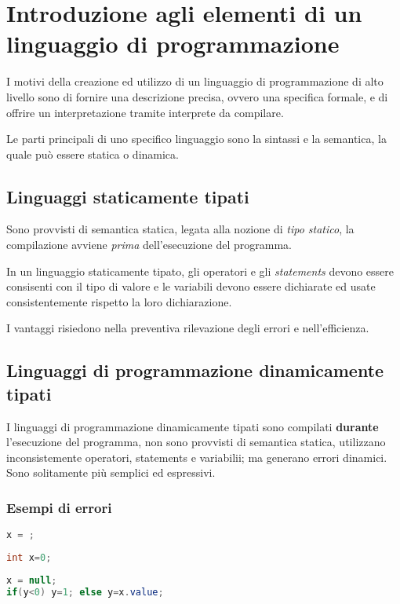 \chapter{Introduzione agli elementi di un linguaggio di programmazione}\label{ch:elementi}
I motivi della creazione ed utilizzo di un linguaggio di programmazione di alto
livello sono di fornire una descrizione precisa, ovvero una specifica formale,
e di offrire un interpretazione tramite interprete da compilare.

Le parti principali di uno specifico linguaggio sono la sintassi e la semantica,
la quale può essere statica o dinamica.

\section{Linguaggi staticamente tipati}
Sono provvisti di semantica statica, legata alla nozione di \emph{tipo statico},
la compilazione avviene   \emph{prima} dell'esecuzione del programma.

In un linguaggio staticamente tipato, gli operatori e gli \textit{statements}
devono essere consisenti con il tipo di valore e le variabili devono essere
dichiarate ed usate consistentemente rispetto la loro dichiarazione.

I vantaggi risiedono nella preventiva rilevazione degli errori e nell'efficienza.

\section{Linguaggi di programmazione dinamicamente tipati}
I linguaggi di programmazione dinamicamente tipati sono compilati \textbf{durante}
l'esecuzione del programma, non sono provvisti di semantica statica, utilizzano
inconsistemente operatori, statements e variabilii; ma generano errori dinamici.
Sono solitamente più semplici ed espressivi.

\subsection{Esempi di errori}
\begin{lstlisting}[language=Java, caption={Errore di sintassi}]
x = ;
\end{lstlisting}

\begin{lstlisting}[language=Java, caption={Errore statico}]
int x=0;
\end{lstlisting}

\begin{lstlisting}[language=Java, caption={Errore Dinamico}]
x = null;
if(y<0) y=1; else y=x.value;
\end{lstlisting}
